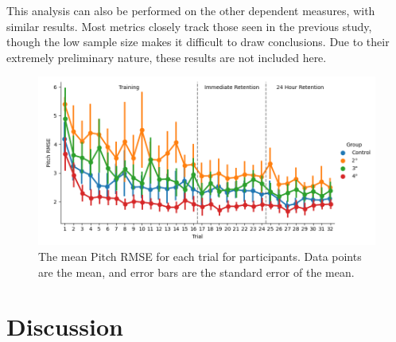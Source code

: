 This analysis can also be performed on the other dependent measures, with similar results.
Most metrics closely track those seen in the previous study, though the low sample size makes it difficult to draw conclusions.
Due to their extremely preliminary nature, these results are not included here.

\begin{figure}[tb!]
    \begin{center}
        \includegraphics[width=\linewidth]{figures/Aircraft/Bandwidth-PitchRMSE.png}
        \caption[The mean Pitch RMSE for each trial]{The mean Pitch RMSE for each trial for participants. Data points are the mean, and error bars are the standard error of the mean.}
        \label{figure-bw:pitchrmse}
    \end{center}
\end{figure}

\section{Discussion}

